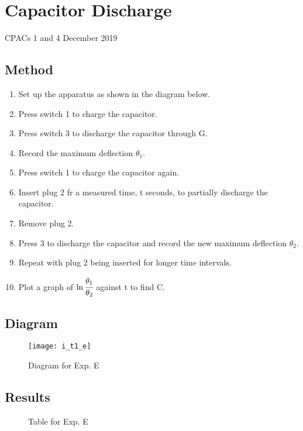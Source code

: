 \section{Capacitor Discharge}
CPACs 1 and 4
\hfill
{} December 2019

\subsection{Method}
\begin{enumerate}
  \item Set up the apparatus as shown in the diagram below.
  \item Press switch 1 to charge the capacitor.
  \item Press switch 3 to discharge the capacitor through G.
  \item Record the maximum deflection $\theta_1$.
  \item Press switch 1 to charge the capacitor again.
  \item Insert plug 2 fr a measured time, t seconds, to partially discharge the capacitor.
  \item Remove plug 2.
  \item Press 3 to discharge the capacitor and record the new maximum deflection $\theta_2$.
  \item Repeat with plug 2 being inserted for longer time intervals.
  \item Plot a graph of $\ln{\cfrac{\theta_1}{\theta_2}}$ against t to find C.
\end{enumerate}

\subsection{Diagram}
\begin{figure}[H]
  \centering
  \texttt{[image: i\_t1\_e]}
  \caption{Diagram for Exp. E}
\end{figure}

\subsection{Results}

\begin{figure}[H]
  \centering
  \caption{Table for Exp. E}
\end{figure}

